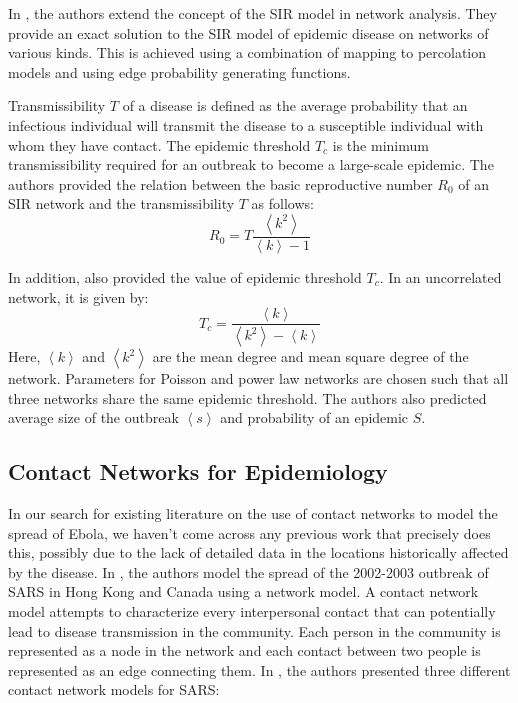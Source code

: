 \documentclass[10pt, journal,onecolumn]{IEEEtran}
\begin{document}
In \citep{newman2002spread}, the authors extend the concept of the SIR model in network analysis.
They provide an exact solution to the SIR model of epidemic disease on networks of various kinds.
This is achieved using a combination of mapping to percolation models and using edge probability generating functions.

Transmissibility $T$ of a disease is defined as the average probability that an infectious
individual will transmit the disease to a susceptible individual with whom they have contact.
The epidemic threshold $T_c$ is the minimum transmissibility required for an outbreak to become
a large-scale epidemic. The authors provided the relation between the basic reproductive number
$R_0$ of an SIR network and the transmissibility $T$ as follows:
\[
R_0 = T  \dfrac{\left\langle k^2 \right\rangle}{\left\langle k \right\rangle-1}
\]

In addition, \citep{newman2002spread} also provided the value of epidemic threshold $T_c$.  In an uncorrelated network, it is given by:
\[
T_c =\dfrac{\left\langle k \right\rangle}{\left\langle k^2 \right\rangle - \left\langle k \right\rangle}
\]
Here, $\left\langle k \right\rangle$ and $\left\langle k^2 \right\rangle$ are the mean degree and mean square degree of the network. Parameters for Poisson and power law networks are chosen such that all three networks share the same epidemic threshold. The authors also predicted average size of the outbreak $\left\langle s \right\rangle$ and probability of an epidemic $S$. 


\subsection{\textbf{Contact Networks for Epidemiology \citep{meyers2005network}}}

In our search for existing literature on the use of contact networks to model the spread of Ebola, we haven't come
across any previous work that precisely does this, possibly due to the lack of detailed data in the
locations historically affected by the disease.
In \citep{meyers2005network}, the authors model the spread of the 2002-2003
outbreak of SARS in Hong Kong and Canada using a network model. A contact network model attempts to
characterize every interpersonal contact that can potentially lead to disease transmission in the
community. Each person in the community is represented as a node in the network and each contact between
two people is represented as an edge connecting them.
In \citep{meyers2005network}, the authors presented three different contact network models for SARS:
\end{document}
